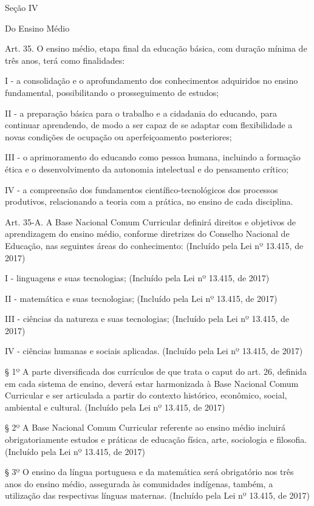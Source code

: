 \documentclass[
]{book}
\begin{document}
Seção IV

Do Ensino Médio

Art. 35. O ensino médio, etapa final da educação básica, com duração mínima de três anos, terá como finalidades:

I - a consolidação e o aprofundamento dos conhecimentos adquiridos no ensino fundamental, possibilitando o prosseguimento de estudos;

II - a preparação básica para o trabalho e a cidadania do educando, para continuar aprendendo, de modo a ser capaz de se adaptar com flexibilidade a novas condições de ocupação ou aperfeiçoamento posteriores;

III - o aprimoramento do educando como pessoa humana, incluindo a formação ética e o desenvolvimento da autonomia intelectual e do pensamento crítico;

IV - a compreensão dos fundamentos científico-tecnológicos dos processos produtivos, relacionando a teoria com a prática, no ensino de cada disciplina.

Art. 35-A. A Base Nacional Comum Curricular definirá direitos e objetivos de aprendizagem do ensino médio, conforme diretrizes do Conselho Nacional de Educação, nas seguintes áreas do conhecimento: (Incluído pela Lei nº 13.415, de 2017)

I - linguagens e suas tecnologias; (Incluído pela Lei nº 13.415, de 2017)

II - matemática e suas tecnologias; (Incluído pela Lei nº 13.415, de 2017)

III - ciências da natureza e suas tecnologias; (Incluído pela Lei nº 13.415, de 2017)

IV - ciências humanas e sociais aplicadas. (Incluído pela Lei nº 13.415, de 2017)

§ 1º A parte diversificada dos currículos de que trata o caput do art. 26, definida em cada sistema de ensino, deverá estar harmonizada à Base Nacional Comum Curricular e ser articulada a partir do contexto histórico, econômico, social, ambiental e cultural. (Incluído pela Lei nº 13.415, de 2017)

§ 2º A Base Nacional Comum Curricular referente ao ensino médio incluirá obrigatoriamente estudos e práticas de educação física, arte, sociologia e filosofia. (Incluído pela Lei nº 13.415, de 2017)

§ 3º O ensino da língua portuguesa e da matemática será obrigatório nos três anos do ensino médio, assegurada às comunidades indígenas, também, a utilização das respectivas línguas maternas. (Incluído pela Lei nº 13.415, de 2017)
\end{document}
